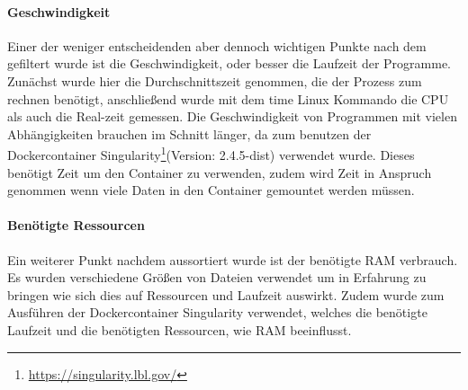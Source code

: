 \documentclass{scrartcl}
\begin{document}
\paragraph{Geschwindigkeit}
\label{sec-3-1-2-3}
Einer der weniger entscheidenden aber dennoch wichtigen Punkte nach dem gefiltert wurde ist die Geschwindigkeit, 
oder besser die Laufzeit der Programme. Zunächst wurde hier die Durchschnittszeit genommen, die der Prozess zum rechnen benötigt,
anschließend wurde mit dem time Linux Kommando die CPU als auch die Real-zeit gemessen. Die Geschwindigkeit von Programmen mit vielen Abhängigkeiten 
brauchen im Schnitt länger, da zum benutzen der Dockercontainer Singularity\footnote{\url{https://singularity.lbl.gov/}}(Version: 2.4.5-dist) verwendet wurde. Dieses benötigt Zeit um den Container zu verwenden,
zudem wird Zeit in Anspruch genommen wenn viele Daten in den Container gemountet werden müssen.
\paragraph{Benötigte Ressourcen}
\label{sec-3-1-2-4}
Ein weiterer Punkt nachdem aussortiert wurde ist der benötigte RAM verbrauch. Es wurden verschiedene Größen von Dateien verwendet
um in Erfahrung zu bringen wie sich dies auf Ressourcen und Laufzeit auswirkt. Zudem wurde zum Ausführen der Dockercontainer 
Singularity \footnotemark[56]{} verwendet, welches die benötigte Laufzeit und die benötigten Ressourcen, wie RAM beeinflusst. 
\end{document}
